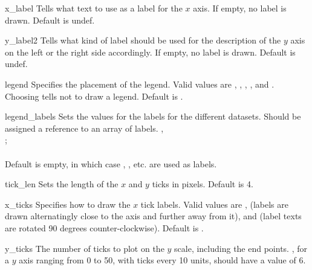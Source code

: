 \begin{AttrDecl}{x\_label}
Tells \chart what text to use as a label for the $x$ axis. If empty, no
label is drawn. Default is undef.
\end{AttrDecl}

\begin{AttrDecl}{y\_label2}
Tells \chart what kind of label should be used for the description of
the $y$ axis on the left or the right side accordingly. If empty, no
label is drawn.  Default is undef.
\end{AttrDecl}

\begin{AttrDecl}{legend}
Specifies the placement of the legend. Valid values are
, , ,
, and . Choosing 
tells \chart not to draw a legend. Default is .
\end{AttrDecl}

\begin{AttrDecl}{legend\_labels}
Sets the values for the labels for the different datasets. Should be
assigned a reference to an array of labels. \Eg,\\
;\\
\\
Default is empty, in which case ,
, etc. are used as labels.
\end{AttrDecl}

\begin{AttrDecl}{tick\_len}
Sets the length of the $x$ and $y$ ticks in pixels. Default is 4.
\end{AttrDecl}

\begin{AttrDecl}{x\_ticks}
Specifies how to draw the $x$ tick labels. Valid values are
,  (labels are drawn alternatingly
close to the axis and further away from it), and 
(label texts are rotated 90 degrees counter-clockwise). Default is
.
\end{AttrDecl}

\begin{AttrDecl}{y\_ticks}
The number of ticks to plot on the $y$ scale, including the end points.
\Eg, for a $y$ axis ranging from 0 to 50, with ticks every 10 units,
 should have a value of 6.
\end{AttrDecl}


